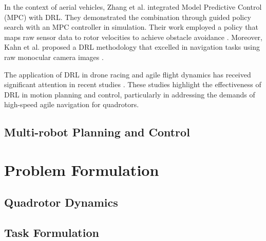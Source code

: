 In the context of aerial vehicles, Zhang et al. integrated Model Predictive Control (MPC) with DRL. They demonstrated the combination through guided policy search with an MPC controller in simulation. Their work employed a policy that maps raw sensor data to rotor velocities to achieve obstacle avoidance \cite{zhang2016learning}. Moreover, Kahn et al. proposed a DRL methodology that excelled in navigation tasks using raw monocular camera images \cite{kahn2018self}.

The application of DRL in drone racing and agile flight dynamics has received significant attention in recent studies \cite{loquercio2019deep, song2021autonomous, song2022policy, penicka2022learning, song2023reaching}. These studies highlight the effectiveness of DRL in motion planning and control, particularly in addressing the demands of high-speed agile navigation for quadrotors.

\subsection{Multi-robot Planning and Control}

\section{Problem Formulation}

\subsection{Quadrotor Dynamics}

\subsection{Task Formulation}




